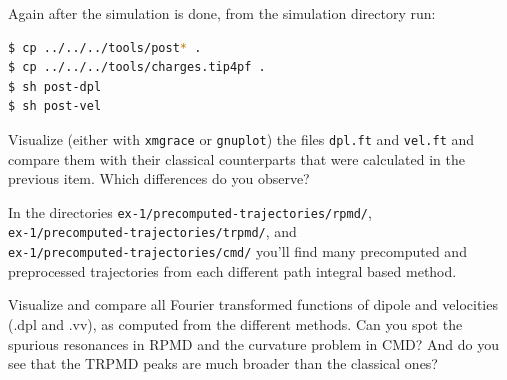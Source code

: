 \documentclass{article}
\begin{document}
\begin{Exercise}[label={realtime},title={Velocity and dipole real time correlation functions}]
\begin{itemize}
Again after the simulation is done, from the simulation directory run:

\begin{lstlisting}[language=Bash,emph={\$}]
$ cp ../../../tools/post* .
$ cp ../../../tools/charges.tip4pf .
$ sh post-dpl
$ sh post-vel
\end{lstlisting}

Visualize (either with \texttt{xmgrace} or \texttt{gnuplot}) the files \texttt{dpl.ft} and \texttt{vel.ft} and compare them with their classical counterparts that were calculated in the previous item. Which differences do you observe?

In the directories \texttt{ex-1/precomputed-trajectories/rpmd/}, \\ \texttt{ex-1/precomputed-trajectories/trpmd/}, and \\ \texttt{ex-1/precomputed-trajectories/cmd/} you'll find many precomputed and preprocessed trajectories from each different path integral based method. 

%
%

Visualize and compare all Fourier transformed functions of dipole and velocities (.dpl and .vv), as computed from the different methods. Can you spot the spurious resonances in RPMD and the curvature problem in CMD? And do you see that the TRPMD peaks are much broader than the classical ones? 

\end{itemize}

\end{Exercise}
\end{document}
